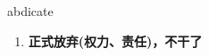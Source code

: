 
\begin{frame}
{\huge abdicate}
\begin{center}
\begin{enumerate}\Large
  \item \textbf{正式放弃(权力、责任)，不干了}
\end{enumerate}
\end{center}
\end{frame}
